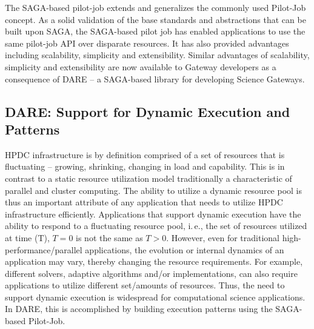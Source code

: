 \documentclass[]{svjour3}
\begin{document}


The SAGA-based pilot-job extends and generalizes the commonly used Pilot-Job concept.
As a solid validation of the base standards and abstractions that
can be built upon SAGA, the SAGA-based pilot job has enabled applications to use the same
pilot-job API over disparate resources. It has also provided advantages including
scalability, simplicity and extensibility. Similar advantages of scalability, simplicity and
extensibility are now available to Gateway developers as a consequence of
DARE – a SAGA-based library for developing Science Gateways.


\subsection{DARE: Support for Dynamic Execution and Patterns}

HPDC infrastructure is by definition comprised of a set of resources
that is fluctuating -- growing, shrinking, changing in load and
capability. This is in contrast to a static resource utilization model
traditionally a characteristic of parallel and cluster computing. The
ability to utilize a dynamic resource pool is thus an important
attribute of any application that needs to utilize HPDC infrastructure
efficiently. Applications that support dynamic execution have the
ability to respond to a fluctuating resource pool, i.\,e., the set of
resources utilized at time (T), $T=0$ is not the same as $T>0$.
However, even for traditional high-performance/parallel applications,
the evolution or internal dynamics of an application may vary, thereby
changing the resource requirements. For example, different solvers,
adaptive algorithms and/or implementations, can also require
applications to utilize different set/amounts of resources. Thus, the
need to support dynamic execution is widespread for computational
science applications. In DARE, this is accomplished by building execution
patterns using the SAGA-based Pilot-Job.
\end{document}
